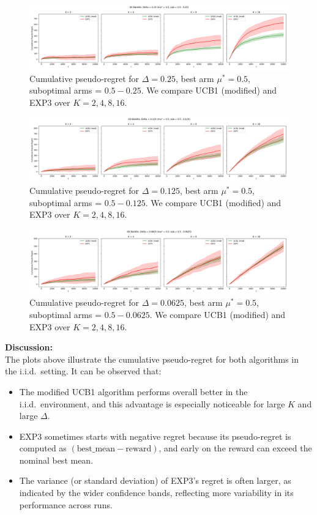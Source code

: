 \begin{figure}[H]
  \centering
  \includegraphics[width=1\textwidth]{Code/iid_experiment_delta_0_25.png}
  \caption{Cumulative pseudo-regret for $\Delta=0.25$, best arm $\mu^* = 0.5$, suboptimal arms = $0.5 - 0.25$. We compare UCB1 (modified) and EXP3 over $K=2,4,8,16$.}
\end{figure}

\begin{figure}[H]
  \centering
  \includegraphics[width=1\textwidth]{Code/iid_experiment_delta_0_125.png}
  \caption{Cumulative pseudo-regret for $\Delta=0.125$, best arm $\mu^* = 0.5$, suboptimal arms = $0.5 - 0.125$. We compare UCB1 (modified) and EXP3 over $K=2,4,8,16$.}
\end{figure}

\begin{figure}[H]
  \centering
  \includegraphics[width=1\textwidth]{Code/iid_experiment_delta_0_0625.png}
  \caption{Cumulative pseudo-regret for $\Delta=0.0625$, best arm $\mu^* = 0.5$, suboptimal arms = $0.5 - 0.0625$. We compare UCB1 (modified) and EXP3 over $K=2,4,8,16$.}
\end{figure}

\bigskip
\textbf{Discussion:} \\
The plots above illustrate the cumulative pseudo-regret for both algorithms in the i.i.d.\ setting. It can be observed that:
\begin{itemize}
    \item The modified UCB1 algorithm performs overall better in the i.i.d.\ environment, and this advantage is especially noticeable for large $K$ and large $\Delta$.
    \item EXP3 sometimes starts with negative regret because its pseudo-regret is computed as $(\text{best\_mean} - \text{reward})$, and early on the reward can exceed the nominal best mean.
    \item The variance (or standard deviation) of EXP3's regret is often larger, as indicated by the wider confidence bands, reflecting more variability in its performance across runs.
\end{itemize}

